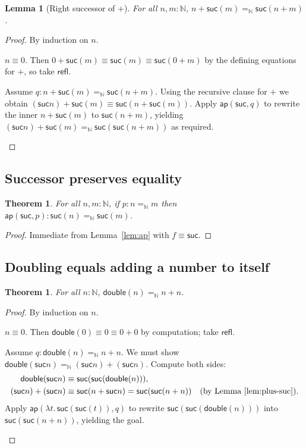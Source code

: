 \documentclass[11pt]{article}
\newcommand{\Nat}{\mathbb{N}}
\newcommand{\suc}{\mathsf{suc}}
\newcommand{\Id}[3]{#1 =_{#2} #3}
\newcommand{\refl}{\mathsf{refl}}
\newcommand{\ap}{\mathsf{ap}}
\theoremstyle{definition}
\theoremstyle{plain}
\newtheorem{theorem}[definition]{Theorem}
\newtheorem{lemma}[definition]{Lemma}
\theoremstyle{remark}
\begin{document}
\begin{lemma}[Right successor of $+$]\label{lem:plus-suc}
For all $n,m{:}\Nat$, $\Id{n + \suc(m)}{\Nat}{\suc(n+m)}$.
\end{lemma}
\begin{proof}
By induction on $n$.
\begin{description}[leftmargin=2em]
\item[Base.] $n \equiv 0$. Then 
$0 + \suc(m) \equiv \suc(m) \equiv \suc(0+m)$ 
by the defining equations for $+$, so take $\refl$.

\item[Step.] Assume $q : \Id{n + \suc(m)}{\Nat}{\suc(n+m)}$. Using the recursive clause for $+$ we obtain $(\suc n) + \suc(m) \equiv \suc(n + \suc(m))$. Apply $\ap(\suc, q)$ to rewrite the inner $n + \suc(m)$ to $\suc(n+m)$, yielding $\Id{(\suc n) + \suc(m)}{\Nat}{\suc(\suc(n+m))}$ as required.
\end{description}
\end{proof}

\subsection{Successor preserves equality}
\begin{theorem}\label{thm:suc-cong}
For all $n,m{:}\Nat$, if $p{:}\Id{n}{\Nat}{m}$ then $\ap(\suc,p) : \Id{\suc(n)}{\Nat}{\suc(m)}$.
\end{theorem}
\begin{proof}
Immediate from Lemma~\ref{lem:ap} with $f \equiv \suc$.
\end{proof}

\subsection{Doubling equals adding a number to itself}
\begin{theorem}\label{thm:double}
For all $n{:}\Nat$, $\Id{\mathsf{double}(n)}{\Nat}{n+n}$.
\end{theorem}
\begin{proof}
By induction on $n$.
\begin{description}[leftmargin=2em]
\item[Base.] $n \equiv 0$. Then $\mathsf{double}(0) \equiv 0 \equiv 0+0$ by computation; take $\refl$.
\item[Step.] Assume $q : \Id{\mathsf{double}(n)}{\Nat}{n+n}$. We must show
$\Id{\mathsf{double}(\suc n)}{\Nat}{(\suc n)+(\suc n)}$.
Compute both sides:
\begin{align*}
\mathsf{double}(\suc n) &\equiv \suc(\suc(\mathsf{double}(n))),\\
(\suc n)+(\suc n) &\equiv \suc(n+\suc n) = \suc(\suc(n+n)) \quad\text{(by Lemma~\ref{lem:plus-suc})}.
\end{align*}
Apply $\ap(\lambda t.\, \suc(\suc(t)), q)$ to rewrite $\suc(\suc(\mathsf{double}(n)))$ into $\suc(\suc(n+n))$, yielding the goal.
\end{description}
\end{proof}
\end{document}
